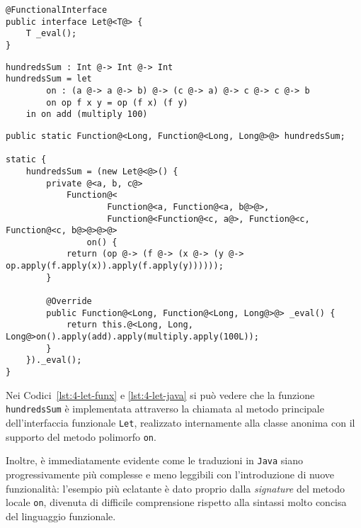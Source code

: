 \vspace{4mm}
\begin{lstlisting}[caption={Interfaccia funzionale per espressioni \texttt{let}}, style=javaCode, label={lst:4-let-interface-java}]
@FunctionalInterface
public interface Let@<T@> {
    T _eval();
}
\end{lstlisting}
\vspace{4mm}
\begin{lstlisting}[caption={Espressione \texttt{let} in \textbf{Funx}}, style=funxCode, label={lst:4-let-funx}]
hundredsSum : Int @-> Int @-> Int
hundredsSum = let
        on : (a @-> a @-> b) @-> (c @-> a) @-> c @-> c @-> b
        on op f x y = op (f x) (f y)
    in on add (multiply 100)
\end{lstlisting}
\vspace{4mm}
\begin{lstlisting}[caption={Corrispondente classe anonima in \texttt{Java}}, style=javaCode, label={lst:4-let-java}]
public static Function@<Long, Function@<Long, Long@>@> hundredsSum;

static {
    hundredsSum = (new Let@<@>() {
        private @<a, b, c@>
            Function@<
                    Function@<a, Function@<a, b@>@>,
                    Function@<Function@<c, a@>, Function@<c, Function@<c, b@>@>@>@>
                on() {
            return (op @-> (f @-> (x @-> (y @-> op.apply(f.apply(x)).apply(f.apply(y))))));
        }

        @Override
        public Function@<Long, Function@<Long, Long@>@> _eval() {
            return this.@<Long, Long, Long@>on().apply(add).apply(multiply.apply(100L));
        }
    })._eval();
}
\end{lstlisting}
\vspace{4mm}

\noindent Nei Codici~\ref{lst:4-let-funx} e \ref{lst:4-let-java} si può vedere che la funzione \texttt{hundredsSum}
è implementata attraverso la chiamata al metodo principale dell'interfaccia funzionale \texttt{Let},
realizzato internamente alla classe anonima con il supporto del metodo polimorfo \texttt{on}.

\noindent Inoltre, è immediatamente evidente come le traduzioni in \texttt{Java} siano progressivamente più complesse e meno leggibili
con l'introduzione di nuove funzionalità: l'esempio più eclatante è dato proprio dalla \textit{signature} del metodo locale \texttt{on},
divenuta di difficile comprensione rispetto alla sintassi molto concisa del linguaggio funzionale.